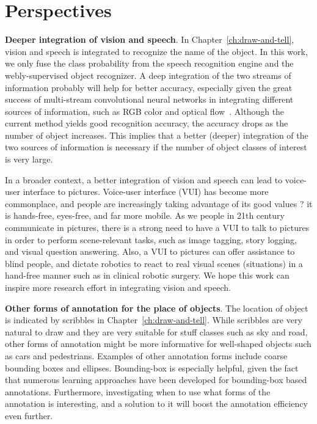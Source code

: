 \section{Perspectives} 

\textbf{Deeper integration of vision and speech}. In Chapter~\ref{ch:draw-and-tell}, vision and speech is integrated to recognize the name of the object. In this work, we only fuse the class probability from the speech recognition engine and the webly-supervised object recognizer. A deep integration of the two streams of information probably will help for better accuracy, especially given the great success of multi-stream convolutional neural networks in integrating different sources of information, such as RGB color and optical flow~\citep{two:stream:cnn}.  Although the current method yields good recognition accuracy, the accuracy drops as the number of object increases. This implies that a better (deeper) integration of the two sources of information is necessary if the number of object classes of interest is very large.  

In a broader context, a better integration of vision and speech can lead to voice-user interface to pictures.  
Voice-user interface (VUI) has become more commonplace, and people are increasingly taking advantage of its good values ? it is hands-free, eyes-free, and far more mobile. As we people in 21th century communicate in pictures,  there is a strong need to have a VUI to talk to pictures in order to perform scene-relevant tasks, such as image tagging, story logging, and visual question answering. Also, a VUI to pictures can offer assistance to blind people, and dictate robotics to react to real visual scenes (situations) in a hand-free manner such as in clinical robotic surgery. We hope this work can inspire more research effort in integrating vision and speech. 


\textbf{Other forms of annotation for the place of objects}. The location of object is indicated by scribbles in Chapter~\ref{ch:draw-and-tell}. While scribbles are very natural to draw and  they are very suitable for stuff classes such as sky and road, other forms of annotation might be more informative for well-shaped objects such as cars and pedestrians. Examples of other annotation forms include coarse bounding boxes and ellipses. Bounding-box is especially helpful, given  the fact that numerous learning approaches have been developed for bounding-box based annotations.  Furthermore, investigating when to use what forms of the annotation is interesting, and a solution to it will boost the annotation efficiency even further.   


